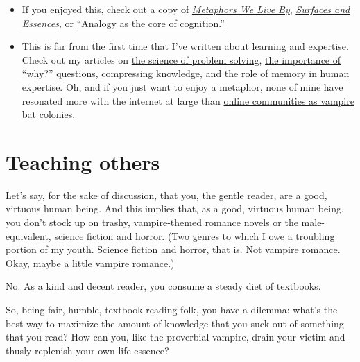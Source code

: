 \begin{itemize}
\itemsep1pt\parskip0pt
\item
  If you enjoyed this, check out a copy of
  \href{http://www.amazon.com/gp/product/0226468011/ref=as_li_tl?ie=UTF8\&camp=1789\&creative=390957\&creativeASIN=0226468011\&linkCode=as2\&tag=rsio-20}{\emph{Metaphors
  We Live By}},
  \href{http://www.amazon.com/gp/product/B00BE65086/ref=as_li_tl?ie=UTF8\&camp=1789\&creative=390957\&creativeASIN=B00BE65086\&linkCode=as2\&tag=rsio-20}{\emph{Surfaces
  and Essences}}, or
  \href{http://worrydream.com/refs/Hofstadter\%20-\%20Analogy\%20as\%20the\%20Core\%20of\%20Cognition.pdf}{``Analogy
  as the core of cognition.''}
\item
  This is far from the first time that I've written about learning and
  expertise. Check out my articles on
  \href{http://rs.io/2014/02/21/problem-solving.html}{the science of
  problem solving},
  \href{http://rs.io/2014/02/25/why-questions-reveal-structure.html}{the
  importance of ``why?'' questions},
  \href{http://rs.io/2014/02/24/compressing-knowledge.html}{compressing
  knowledge}, and the
  \href{http://rs.io/2014/01/20/human-expertise-and-memory-machines.html}{role
  of memory in human expertise}. Oh, and if you just want to enjoy a
  metaphor, none of mine have resonated more with the internet at large
  than
  \href{http://rs.io/2014/02/26/why-online-communities-decay-over-time.html}{online
  communities as vampire bat colonies}.
\end{itemize}

\section{Teaching others}

Let's say, for the sake of discussion, that you, the gentle reader, are
a good, virtuous human being. And this implies that, as a good, virtuous
human being, you don't stock up on trashy, vampire-themed romance novels
or the male-equivalent, science fiction and horror. (Two genres to which
I owe a troubling portion of my youth. Science fiction and horror, that
is. Not vampire romance. Okay, maybe a little vampire romance.)

No. As a kind and decent reader, you consume a steady diet of textbooks.

So, being fair, humble, textbook reading folk, you have a dilemma:
what's the best way to maximize the amount of knowledge that you suck
out of something that you read? How can you, like the proverbial
vampire, drain your victim and thusly replenish your own life-essence?

